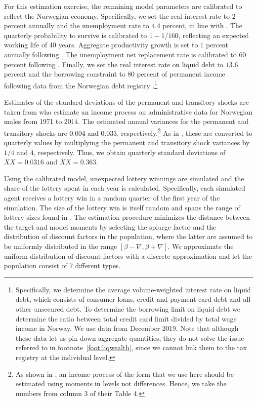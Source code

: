 \documentclass[../HAFiscal]{subfiles}
\begin{document}
For this estimation exercise, the remaining model parameters are calibrated to reflect the Norwegian economy. Specifically, we set the real interest rate to $2$ percent annually and the unemployment rate to $4.4$ percent, in line with \citet{aursland_state-dependent_2020}. The quarterly probability to survive is calibrated to $1-1/160$, reflecting an expected working life of 40 years. Aggregate productivity growth is set to $1$ percent annually following \citet{kravik_navigating_2019}. The unemployment net replacement rate is calibrated to $60$ percent following \citet{oecd_net_2020}. Finally, we set the real interest rate on liquid debt to $13.6$ percent and the borrowing constraint to $80$ percent of permanent income following data from the Norwegian debt registry \citet{gjeldsregistret_nokkeltall_2022}.\footnote{Specifically, we determine the average volume-weighted interest rate on liquid debt, which consists of consumer loans, credit and payment card debt and all other unsecured debt. To determine the borrowing limit on liquid debt we determine the ratio between total credit card limit divided by total wage income in Norway. We use data from December 2019. Note that although these data let us pin down aggregate quantities, they do not solve the issue referred to in footnote~\ref{foot:liqwealth}, since we cannot link them to the tax registry at the individual level.}

Estimates of the standard deviations of the permanent and transitory shocks are taken from \citet{crawley2022parsimonious} who estimate an income process on administrative data for Norwegian males from 1971 to 2014. The estimated annual variances for the permanent and transitory shocks are 0.004 and 0.033, respectively.\footnote{As shown in \citet{crawley2022parsimonious}, an income process of the form that we use here should be estimated using moments in levels not differences. Hence, we take the numbers from column 3 of their Table 4.} As in \citet{carroll2020sticky}, these are converted to quarterly values by multiplying the permanent and transitory shock variances by $1/4$ and $4$, respectively. Thus, we obtain quarterly standard deviations of $XX=0.0316$ and $XX=0.363$.

Using the calibrated model, unexpected lottery winnings are simulated and the share of the lottery spent in each year is calculated. Specifically, each simulated agent receives a lottery win in a random quarter of the first year of the simulation. The size of the lottery win is itself random and spans the range of lottery sizes found in \citet{fagereng_mpc_2021}. The estimation procedure minimizes the distance between the target and model moments by selecting the splurge factor and the distribution of discount factors in the population, where the latter are assumed to be uniformly distributed in the range $[\beta-\nabla, \beta+\nabla]$. We approximate the uniform distribution of discount factors with a discrete approximation and let the population consist of $7$ different types.
\end{document}
